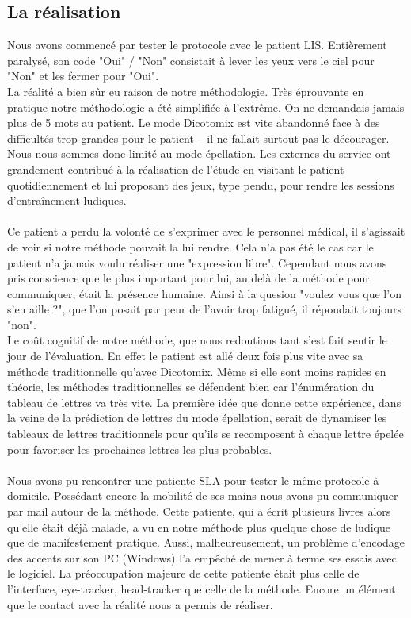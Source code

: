 \documentclass[11pt,a4paper]{article}
\theoremstyle{plain}
\theoremstyle{definition}
\begin{document}
\subsection{La réalisation}

Nous avons commencé par tester le protocole avec le patient LIS. Entièrement paralysé, son code "Oui" / "Non" consistait à lever les yeux vers le ciel 
pour "Non" et les fermer pour "Oui". \\
La réalité a bien sûr eu raison de notre méthodologie. Très éprouvante en pratique notre méthodologie a été simplifiée à l'extrême. On ne demandais jamais plus de 5 mots 
au patient. Le mode Dicotomix est vite abandonné face à des difficultés trop grandes pour le patient -- il ne fallait surtout pas le décourager. Nous nous sommes donc limité
au mode épellation. Les externes du service ont grandement contribué à la réalisation de l'étude en visitant le patient quotidiennement et lui proposant des jeux, type pendu, 
pour rendre les sessions d'entraînement ludiques. 

\paragraph{}Ce patient a perdu la volonté de s'exprimer avec le personnel médical, il s'agissait de voir si notre méthode pouvait la
 lui rendre. Cela n'a pas été le cas car le patient n'a jamais voulu réaliser une "expression libre". Cependant nous avons pris conscience que le plus important pour lui, au delà de la 
 méthode pour communiquer, était la présence humaine. Ainsi à la quesion "voulez vous que l'on s'en aille ?", que l'on posait par peur de l'avoir trop fatigué, il répondait toujours "non". \\
 Le coût cognitif de notre méthode, que nous redoutions tant s'est fait sentir le jour de l'évaluation. En effet le patient est allé deux fois plus vite avec sa 
 méthode traditionnelle qu'avec Dicotomix. Même si elle sont moins rapides en théorie, les méthodes traditionnelles se défendent bien car l'énumération du tableau de lettres
 va très vite. La première idée que donne cette expérience, dans la veine de la prédiction de lettres du mode épellation, serait de dynamiser les tableaux de lettres traditionnels
 pour qu'ils se recomposent à chaque lettre épelée pour favoriser les prochaines lettres les plus probables. 

\paragraph{}Nous avons pu rencontrer une patiente SLA pour tester le même protocole à domicile. Possédant encore la mobilité de ses mains nous avons pu communiquer par mail autour de la méthode.
Cette patiente, qui a écrit plusieurs livres alors qu'elle était déjà malade, a vu en notre méthode plus quelque chose de ludique que de manifestement pratique. Aussi, malheureusement, un problème 
d'encodage des accents sur son PC (Windows) l'a empêché de mener à terme ses essais avec le logiciel. La préoccupation majeure de cette patiente était plus celle de l'interface, eye-tracker, head-tracker que
celle de la méthode. Encore un élément que le contact avec la réalité nous a permis de réaliser.
\end{document}

